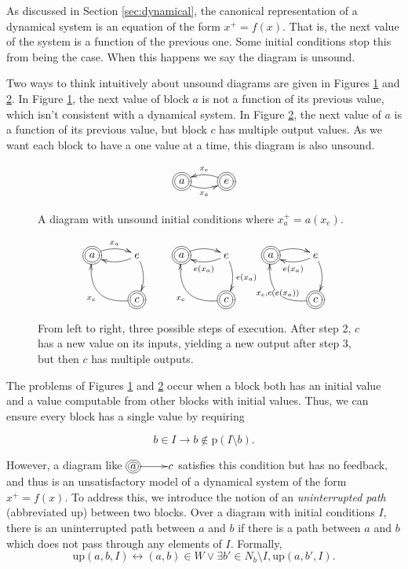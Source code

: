 \documentclass[twocolumn]{article}
\newcommand*{\Inputs}[1]{N_{#1}}
\begin{document}
As discussed in Section \ref{sec:dynamical}, the canonical representation of a dynamical system is an equation of the form $x^+=f(x)$. That is, the next value of the system is a function of the previous one. Some initial conditions stop this from being the case. When this happens we say the diagram is unsound.

Two ways to think intuitively about unsound diagrams are given in Figures \ref{fig:dynamicalexample} and \ref{fig:multi-value-soundness}. In Figure \ref{fig:dynamicalexample}, the next value of block $a$ is not a function of its previous value, which isn't consistent with a dynamical system. In Figure \ref{fig:multi-value-soundness}, the next value of $a$ is a function of its previous value, but block $c$ has multiple output values. As we want each block to have a one value at a time, this diagram is also unsound.

\begin{figure}[h]
\[
\xymatrix{
    *++[o][F=]{a} \ar@/_/[r]_{x_a} & *++[o][F=]{e} \ar@/_/[l]_{x_e}
}
\]
    \caption{A diagram with unsound initial conditions where $x_a^+=a(x_e)$.}
    \label{fig:dynamicalexample}
\end{figure}

\begin{figure}
\[
\xymatrix{
*++[o][F=]{a} \ar@/^/[r]^{x_a} & e \ar@/^/[l] \ar@/^/[d] & *++[o][F=]{a} \ar@/^/[r] & e \ar@/^/[l]^{e(x_a)} \ar@/^/[d]^{e(x_a)} & *++[o][F=]{a} \ar@/^/[r] & e \ar@/^/[l]^{e(x_a)} \ar@/^/[d] \\
  & *++[o][F=]{c} \ar@/^2em/[lu]^{x_c} && *++[o][F=]{c} \ar@/^2em/[lu]^{x_c} && *++[o][F=]{c} \ar@/^2em/[lu]|{x_c,c(e(x_a))}
}
\]
    \caption{From left to right, three possible steps of execution. After step 2, $c$ has a new value on its inputs, yielding a new output after step 3, but then $c$ has multiple outputs.}
    \label{fig:multi-value-soundness}
\end{figure}

The problems of Figures \ref{fig:dynamicalexample} and \ref{fig:multi-value-soundness} occur when a block both has an initial value and a value computable from other blocks with initial values. Thus, we can ensure every block has a single value by requiring

\[
b\in I\rightarrow b\not\in\text{p}(I\setminus b).
\]

However, a diagram like $\xymatrix@1{*++++[o][F=]{a} \ar[r] & c}$ satisfies this condition but has no feedback, and thus is an unsatisfactory model of a dynamical system of the form $x^+=f(x)$. To address this, we introduce the notion of an \textit{uninterrupted path} (abbreviated $\text{up}$) between two blocks. Over a diagram with initial conditions $I$, there is an uninterrupted path between $a$ and $b$ if there is a path between $a$ and $b$ which does not pass through any elements of $I$. Formally,
\[
    \text{up}(a,b,I) \leftrightarrow (a, b)\in W \lor \exists b'\in \Inputs{b}\setminus I, \text{up}(a,b',I).
\]
\end{document}
